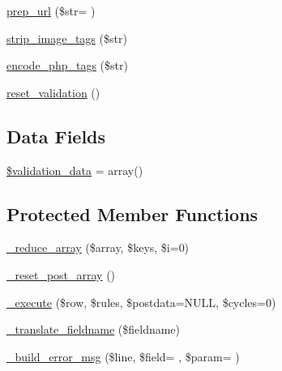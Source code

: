 \begin{DoxyCompactItemize}
\item 
\hyperlink{class_c_i___form__validation_aa781d9b3c62b5e2803da073e926dca42}{prep\+\_\+url} (\$str= \textquotesingle{}\textquotesingle{})
\item 
\hyperlink{class_c_i___form__validation_abb836a42971c7bc641588db779c6ab1d}{strip\+\_\+image\+\_\+tags} (\$str)
\item 
\hyperlink{class_c_i___form__validation_ae8fff4cb083a2a66c900f8bd61216bdd}{encode\+\_\+php\+\_\+tags} (\$str)
\item 
\hyperlink{class_c_i___form__validation_a84b8bd64032f6be532968015cba11361}{reset\+\_\+validation} ()
\end{DoxyCompactItemize}
\subsection*{Data Fields}
\begin{DoxyCompactItemize}
\item 
\hyperlink{class_c_i___form__validation_af1df05337bb40c1d30c3d8c62fe8696c}{\$validation\+\_\+data} = array()
\end{DoxyCompactItemize}
\subsection*{Protected Member Functions}
\begin{DoxyCompactItemize}
\item 
\hyperlink{class_c_i___form__validation_a20ed7e44a35f5a5f6db5a6b220151df0}{\+\_\+reduce\+\_\+array} (\$array, \$keys, \$i=0)
\item 
\hyperlink{class_c_i___form__validation_a5cb72e21d23a62d15655b8caaa493698}{\+\_\+reset\+\_\+post\+\_\+array} ()
\item 
\hyperlink{class_c_i___form__validation_a00fc7d98650d07098dd4a13b486c3dea}{\+\_\+execute} (\$row, \$rules, \$postdata=N\+U\+L\+L, \$cycles=0)
\item 
\hyperlink{class_c_i___form__validation_ae6b1edc93754376c05622d905845c215}{\+\_\+translate\+\_\+fieldname} (\$fieldname)
\item 
\hyperlink{class_c_i___form__validation_a19ec04d526d2c43a6543a50a7d08d778}{\+\_\+build\+\_\+error\+\_\+msg} (\$line, \$field= \textquotesingle{}\textquotesingle{}, \$param= \textquotesingle{}\textquotesingle{})
\end{DoxyCompactItemize}
